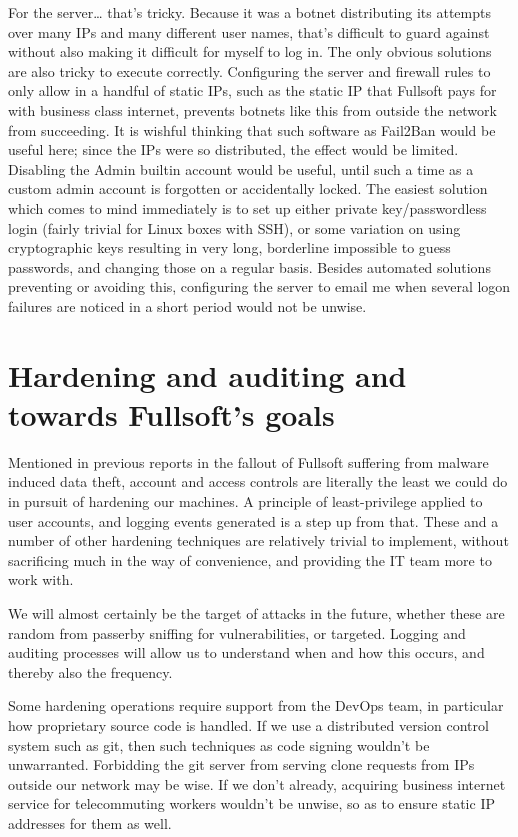 For the server\ldots{} that's tricky. Because it was a botnet
distributing its attempts over many IPs and many different user names,
that's difficult to guard against without also making it difficult for
myself to log in. The only obvious solutions are also tricky to execute
correctly. Configuring the server and firewall rules to only allow in a
handful of static IPs, such as the static IP that Fullsoft pays for with
business class internet, prevents botnets like this from outside the
network from succeeding. It is wishful thinking that such software as
Fail2Ban would be useful here; since the IPs were so distributed, the
effect would be limited. Disabling the Admin builtin account would be
useful, until such a time as a custom admin account is forgotten or
accidentally locked. The easiest solution which comes to mind
immediately is to set up either private key/passwordless login (fairly
trivial for Linux boxes with SSH), or some variation on using
cryptographic keys resulting in very long, borderline impossible to
guess passwords, and changing those on a regular basis. Besides
automated solutions preventing or avoiding this, configuring the server
to email me when several logon failures are noticed in a short period
would not be unwise.

\hypertarget{hardening-and-auditing-and-towards-fullsofts-goals}{%
\section{Hardening and auditing and towards Fullsoft's
goals}\label{hardening-and-auditing-and-towards-fullsofts-goals}}

Mentioned in previous reports in the fallout of Fullsoft suffering from
malware induced data theft, account and access controls are literally
the least we could do in pursuit of hardening our machines. A principle
of least-privilege applied to user accounts, and logging events
generated is a step up from that. These and a number of other hardening
techniques are relatively trivial to implement, without sacrificing much
in the way of convenience, and providing the IT team more to work with.

We will almost certainly be the target of attacks in the future, whether
these are random from passerby sniffing for vulnerabilities, or
targeted. Logging and auditing processes will allow us to understand
when and how this occurs, and thereby also the frequency.

Some hardening operations require support from the DevOps team, in
particular how proprietary source code is handled. If we use a
distributed version control system such as git, then such techniques as
code signing wouldn't be unwarranted. Forbidding the git server from
serving clone requests from IPs outside our network may be wise. If we
don't already, acquiring business internet service for telecommuting
workers wouldn't be unwise, so as to ensure static IP addresses for them
as well.

